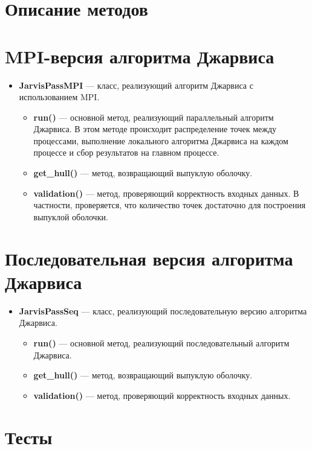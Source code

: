 \documentclass[12pt]{article}
\begin{document}
\section*{Описание методов}

\section*{MPI-версия алгоритма Джарвиса}

\begin{itemize}
\item \textbf{JarvisPassMPI} — класс, реализующий алгоритм Джарвиса с использованием MPI.
\begin{itemize}
\item \textbf{run()} — основной метод, реализующий параллельный алгоритм Джарвиса. В этом методе происходит распределение точек между процессами, выполнение локального алгоритма Джарвиса на каждом процессе и сбор результатов на главном процессе.
\item \textbf{get\_hull()} — метод, возвращающий выпуклую оболочку.
\item \textbf{validation()} — метод, проверяющий корректность входных данных. В частности, проверяется, что количество точек достаточно для построения выпуклой оболочки.
\end{itemize}
\end{itemize}

\section*{Последовательная версия алгоритма Джарвиса}

\begin{itemize}
\item \textbf{JarvisPassSeq} — класс, реализующий последовательную версию алгоритма Джарвиса.
\begin{itemize}
\item \textbf{run()} — основной метод, реализующий последовательный алгоритм Джарвиса.
\item \textbf{get\_hull()} — метод, возвращающий выпуклую оболочку.
\item \textbf{validation()} — метод, проверяющий корректность входных данных.
\end{itemize}
\end{itemize}

\section*{Тесты}
\end{document}
